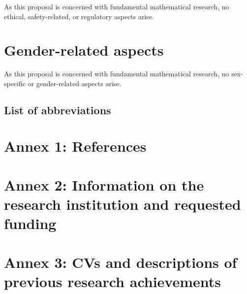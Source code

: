 \documentclass[a4paper,11pt]{scrartcl}
\begin{document}
As this proposal is concerned with fundamental mathematical research, no ethical, safety-related, or regulatory aspects arise.

\section{Gender-related aspects}\label{sec:gender}

As this proposal is concerned with fundamental mathematical research, no sex-specific or gender-related aspects arise.


\newpage

\subsection{List of abbreviations}

\printacronyms[heading=none, display=all]

\newpage
\section*{Annex 1: References}

\printbibliography[heading=none]

\newpage
\section*{Annex 2: Information on the research institution and requested funding}


\newpage
\section*{Annex 3: CVs and descriptions of previous research achievements}



\newpage
\end{document}
